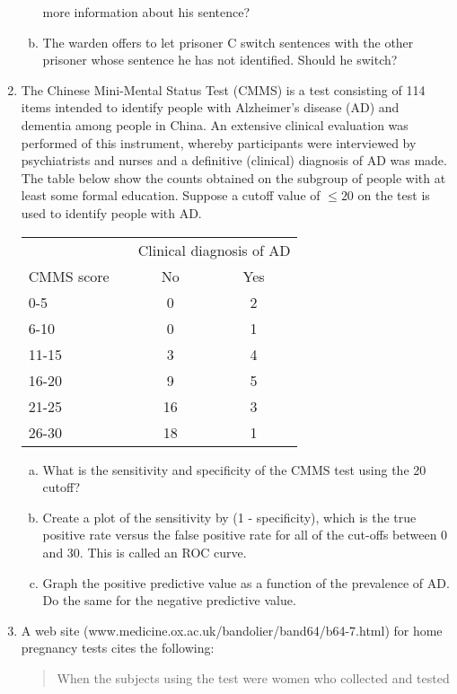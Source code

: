\documentclass[12pt]{article}
\begin{document}
\begin{enumerate}[Problem 1.]
\begin{enumerate}[a.]
more information about his sentence?
\item The warden offers to let prisoner C switch sentences with the other prisoner whose sentence
he has not identified. Should he switch?
\end{enumerate}
\item The Chinese Mini-Mental Status Test (CMMS) is a test consisting
  of 114 items intended to identify people with Alzheimer's disease
  (AD) and dementia among people in China. An extensive clinical
  evaluation was performed of this instrument, whereby participants
  were interviewed by psychiatrists and nurses and a definitive
  (clinical) diagnosis of AD was made. The table below show the counts
  obtained on the subgroup of people with at least some formal education.
  Suppose a cutoff value of $\leq 20$ on the test is used to identify
  people with AD.
  \begin{center}
    \begin{tabular}{lccc}
        && \multicolumn{2}{c}{Clinical diagnosis of AD} \\ \cline{3-4}
     CMMS score && No & Yes \\ \hline
     0-5   && 0  & 2 \\
     6-10  && 0  & 1 \\
     11-15 && 3  & 4 \\
     16-20 && 9  & 5 \\
     21-25 && 16 & 3 \\
     26-30 && 18 & 1 \\ \hline
    \end{tabular}
  \end{center}
  \begin{enumerate}[a.]
  \item What is the sensitivity and specificity of the CMMS test using the 20 cutoff?
  \item Create a plot of the sensitivity by (1 - specificity), which is the true positive
    rate versus the false positive rate for all of the cut-offs between 0 and 30. This is
    called an ROC curve.
  \item Graph the positive predictive value as a function of the prevalence of AD.
    Do the same for the negative predictive value.
  \end{enumerate}
\item  A web site (www.medicine.ox.ac.uk/bandolier/band64/b64-7.html) for home pregnancy tests cites the following:
\begin{quote}
  When the subjects using the test were women who collected and tested

\end{quote}
\end{enumerate}
\end{document}
